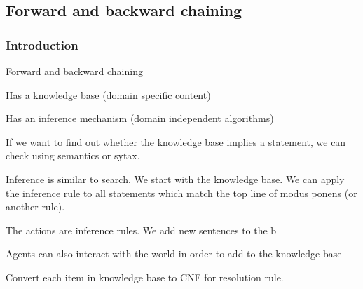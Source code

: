 
\subsection{Forward and backward chaining}

\subsubsection{Introduction}

Forward and backward chaining

Has a knowledge base (domain specific content)

Has an inference mechanism (domain independent algorithms)

If we want to find out whether the knowledge base implies a statement, we can check using semantics or sytax.

Inference is similar to search. We start with the knowledge base. We can apply the inference rule to all statements which match the top line of modus ponens (or another rule).

The actions are inference rules. We add new sentences to the b

Agents can also interact with the world in order to add to the knowledge base

Convert each item in knowledge base to CNF for resolution rule.

